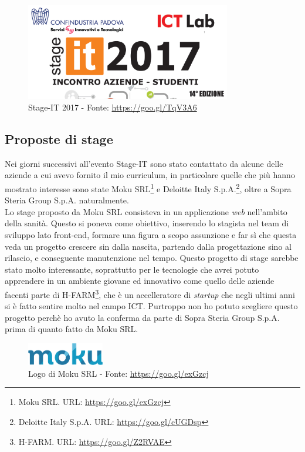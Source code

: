 	\begin{figure}[H]
		\centering
	   	\includegraphics[width=0.8\textwidth]{immagini/StageIT}
	   	\caption{Stage-IT 2017 - Fonte: \url{https://goo.gl/TqV3A6}}
	\end{figure}

\subsection{Proposte di stage}

Nei giorni successivi all'evento Stage-IT sono stato contattato da alcune delle aziende a cui avevo fornito il mio curriculum, in particolare quelle che più hanno mostrato interesse sono state Moku SRL\footnote{Moku SRL. URL: \url{https://goo.gl/exGzcj}} e Deloitte Italy S.p.A.\footnote{Deloitte Italy S.p.A. URL: \url{https://goo.gl/cUGDsp}}, oltre a Sopra Steria Group S.p.A. naturalmente.\\

Lo stage proposto da Moku SRL consisteva in un applicazione \textit{web} nell'ambito della sanità. Questo si poneva come obiettivo, inserendo lo stagista nel team di sviluppo lato front-end\glossario, formare una figura a scopo assunzione e far sì che questa veda un progetto crescere sin dalla nascita, partendo dalla progettazione sino al rilascio, e conseguente manutenzione nel tempo. Questo progetto di stage sarebbe stato molto interessante, soprattutto per le tecnologie che avrei potuto apprendere in un ambiente giovane ed innovativo come quello delle aziende facenti parte di H-FARM\footnote{H-FARM. URL: \url{https://goo.gl/Z2RVAE}}, che è un accelleratore di \textit{startup} che negli ultimi anni si è fatto sentire molto nel campo ICT. Purtroppo non ho potuto scegliere questo progetto perchè ho avuto la conferma da parte di Sopra Steria Group S.p.A. prima di quanto fatto da Moku SRL.\\
	\begin{figure}[H]
		\centering
	   	\includegraphics[width=0.3\textwidth]{immagini/moku}
	   	\caption{Logo di Moku SRL - Fonte: \url{https://goo.gl/exGzcj}}
	\end{figure}


